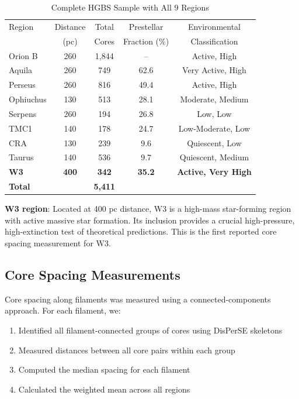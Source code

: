 \documentclass[11pt,a4paper]{article}
\begin{document}
\begin{table}[H]
\centering
\caption{Complete HGBS Sample with All 9 Regions}
\begin{tabular}{lcccc}
\toprule
Region & Distance & Total & Prestellar & Environmental \\
       & (pc)   & Cores & Fraction (\%) & Classification \\
\midrule
Orion B  & 260     & 1,844 & --       & Active, High \\
Aquila   & 260     & 749   & 62.6     & Very Active, High \\
Perseus  & 260     & 816   & 49.4     & Active, High \\
Ophiuchus& 130     & 513   & 28.1     & Moderate, Medium \\
Serpens  & 260     & 194   & 26.8     & Low, Low \\
TMC1     & 140     & 178   & 24.7     & Low-Moderate, Low \\
CRA      & 130     & 239   & 9.6      & Quiescent, Low \\
Taurus   & 140     & 536   & 9.7      & Quiescent, Medium \\
\textbf{W3}      & \textbf{400}     & \textbf{342}   & \textbf{35.2}     & \textbf{Active, Very High} \\
\midrule
\textbf{Total} &        & \textbf{5,411} &        &  \\
\bottomrule
\end{tabular}
\end{table}

\noindent\textbf{W3 region}: Located at 400 pc distance, W3 is a high-mass star-forming region with active massive star formation. Its inclusion provides a crucial high-pressure, high-extinction test of theoretical predictions. This is the first reported core spacing measurement for W3.

\subsection{Core Spacing Measurements}

Core spacing along filaments was measured using a connected-components approach. For each filament, we:
\begin{enumerate}
    \item Identified all filament-connected groups of cores using DisPerSE skeletons
    \item Measured distances between all core pairs within each group
    \item Computed the median spacing for each filament
    \item Calculated the weighted mean across all regions
\end{enumerate}
\end{document}
